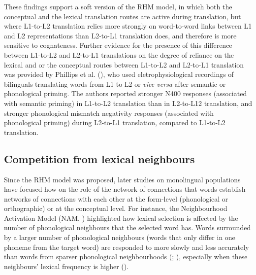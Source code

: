 \documentclass[
]{article}
\begin{document}
These findings support a soft version of the RHM model, in which both
the conceptual and the lexical translation routes are active during
translation, but where L1-to-L2 translation relies more strongly on
word-to-word links between L1 and L2 representations than L2-to-L1
translation does, and therefore is more sensitive to cognateness.
Further evidence for the presence of this difference between L1-to-L2
and L2-to-L1 translations on the degree of reliance on the lexical and
or the conceptual routes between L1-to-L2 and L2-to-L1 translation was
provided by Phillips et al. (), who
used eletrophysiological recordings of bilinguals translating words from
L1 to L2 or \emph{vice versa} after semantic or phonological priming.
The authors reported stronger N400 responses (associated with semantic
priming) in L1-to-L2 translation than in L2-to-L12 translation, and
stronger phonological mismatch negativity responses (associated with
phonological priming) during L2-to-L1 translation, compared to L1-to-L2
translation.

\subsection{Competition from lexical
neighbours}\label{competition-from-lexical-neighbours}

Since the RHM model was proposed, later studies on monolingual
populations have focused how on the role of the network of connections
that words establish networks of connections with each other at the
form-level (phonological or orthographic) or at the conceptual level.
For instance, the Neighbourhood Activation Model (NAM,
) highlighted
how lexical selection is affected by the number of phonological
neighbours that the selected word has. Words surrounded by a larger
number of phonological neighbours (words that only differ in one phoneme
from the target word) are responded to more slowly and less accurately
than words from sparser phonological neighbourhoods
(;
), especially when
these neighbours' lexical frequency is higher
().
\end{document}

